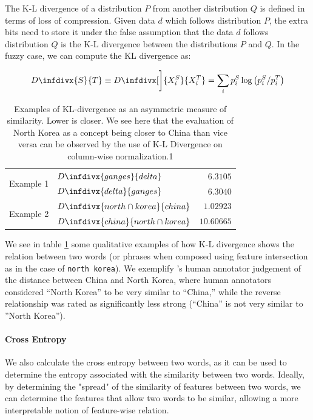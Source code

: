 \documentclass[11pt]{book}
\newcommand{\infdiv}{D\infdivx}
\newcommand{\citet}[1]{\cite{#1}}
\begin{document}
The K-L divergence of a distribution $P$ from another distribution $Q$ is
defined in terms of loss of compression. Given data $d$ which follows
distribution $P$, the extra bits need to store it under the false assumption
that the data $d$ follows distribution $Q$ is the K-L divergence between the
distributions $P$ and $Q$. In the fuzzy case, we can compute the KL divergence
as:

\begin{equation*}
     \infdiv{S}{T} \equiv \infdiv[\bigg]{X^S_i}{X^T_i} =  \sum_i p^S_i \log \left( p^S_i / p^T_i \right)
\end{equation*}

\begin{table}[]
    \centering
    \begin{tabular}{clr}
        \multirow{2}{*}{Example 1} & $\infdiv{ganges}{delta}$ & $6.3105$  \\
                                   & $\infdiv{delta}{ganges}$ & $6.3040$  \\
        \multirow{2}{*}{Example 2} & $\infdiv{north \cap korea}{china}$ & $1.02923$ \\
                                   & $\infdiv{china}{north \cap korea}$ & $10.60665$
    \end{tabular}
    \caption{Examples of KL-divergence as an asymmetric measure of similarity. Lower is closer. We see here that the evaluation of North Korea as a concept being closer to China than vice versa can be observed by the use of K-L Divergence on column-wise normalization.1}
    \label{tab: k-l divergence}
\end{table}

We see in table \ref{tab: k-l divergence} some qualitative examples of how K-L
divergence shows the relation between two words (or phrases when composed using
feature intersection as in the case of \texttt{north korea}). We exemplify
\citet{nematzadeh2017evaluating}'s human annotator judgement of the distance
between China and North Korea, where human annotators considered “North Korea”
to be very similar to “China,” while the reverse relationship was rated as
significantly less strong (“China” is not very similar to ”North Korea”).

\paragraph{Cross Entropy} We also calculate the cross entropy between two
words, as it can be used to determine the entropy associated with the
similarity between two words. Ideally, by determining the "spread" of the
similarity of features between two words, we can determine the features that
allow two words to be similar, allowing a more interpretable notion of
feature-wise relation.
\end{document}
